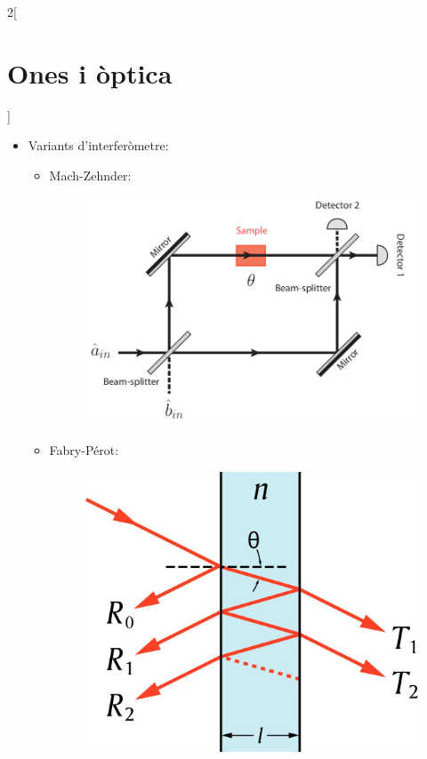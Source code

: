\documentclass[class=article,10pt,crop=false]{standalone}
\begin{document}
\begin{multicols}{2}[\section{Ones i òptica}]
\begin{itemize}
\begin{itemize}
        \item Variants d'interferòmetre:
        \begin{itemize}
            \item Mach-Zehnder:\newline
            \begin{figure}[ht]
                \includegraphics[width=\linewidth]{Physics/1st/Ones_i_optica/Imatges/zehnder.png} 
                \caption{}
            \end{figure}
            \item Fabry-Pérot:\newline
            \begin{figure}[ht]
                \includegraphics[width=\linewidth]{Physics/1st/Ones_i_optica/Imatges/fabry.jpg} 

\end{figure}
\end{itemize}
\end{itemize}
\end{itemize}
\end{multicols}
\end{document}
